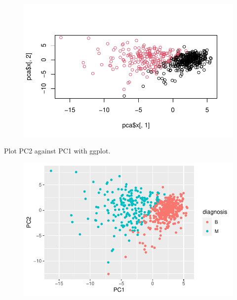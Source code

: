 \documentclass[
  letterpaper,
  DIV=11,
  numbers=noendperiod]{scrartcl}
\newenvironment{Shaded}{\begin{snugshade}}{\end{snugshade}}
\newcommand{\AttributeTok}[1]{\textcolor[rgb]{0.40,0.45,0.13}{#1}}
\newcommand{\FunctionTok}[1]{\textcolor[rgb]{0.28,0.35,0.67}{#1}}
\newcommand{\NormalTok}[1]{\textcolor[rgb]{0.00,0.23,0.31}{#1}}
\newcommand{\SpecialCharTok}[1]{\textcolor[rgb]{0.37,0.37,0.37}{#1}}
\begin{document}
\begin{figure}[H]

{\centering \includegraphics{class08_files/figure-pdf/unnamed-chunk-10-1.pdf}

}

\end{figure}

Plot PC2 against PC1 with ggplot.

\begin{Shaded}
\end{Shaded}

\begin{figure}[H]

{\centering \includegraphics{class08_files/figure-pdf/unnamed-chunk-11-1.pdf}

}

\end{figure}
\end{document}
